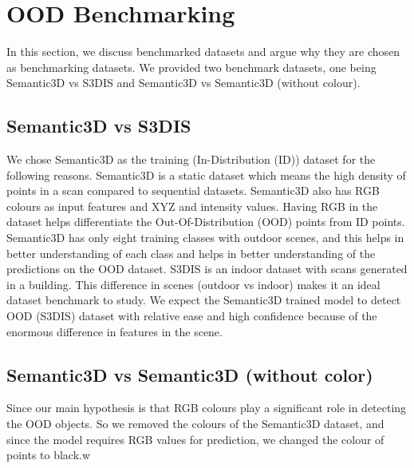 \section{OOD Benchmarking}
In this section, we discuss benchmarked datasets and argue why they are chosen as benchmarking datasets.
We provided two benchmark datasets, one being Semantic3D vs S3DIS and Semantic3D vs Semantic3D (without colour).

\subsection{Semantic3D vs S3DIS}
We chose Semantic3D as the training (In-Distribution (ID)) dataset for the following reasons.
Semantic3D is a static dataset which means the high density of points in a scan compared to sequential datasets.
Semantic3D also has RGB colours as input features and XYZ and intensity values.
Having RGB in the dataset helps differentiate the Out-Of-Distribution (OOD) points from ID points.
Semantic3D has only eight training classes with outdoor scenes, and this helps in better understanding of each class and helps in better understanding of the predictions on the OOD dataset.
S3DIS is an indoor dataset with scans generated in a building.
This difference in scenes (outdoor vs indoor) makes it an ideal dataset benchmark to study.
We expect the Semantic3D trained model to detect OOD (S3DIS) dataset with relative ease and high confidence because of the enormous difference in features in the scene.

\subsection{Semantic3D vs Semantic3D (without color)}
Since our main hypothesis is that RGB colours play a significant role in detecting the OOD objects.
So we removed the colours of the Semantic3D dataset, and since the model requires RGB values for prediction, we changed the colour of points to black.w
